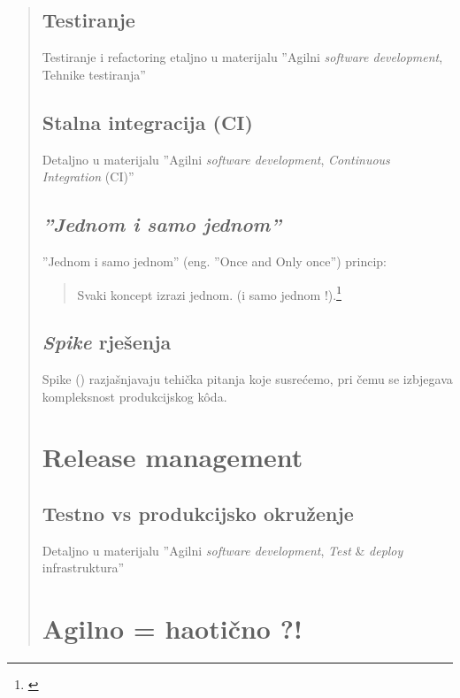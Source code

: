 \documentclass[lmodern, utf8, zavrsni]{fit}
\begin{document}
\begin{quote}
\section{Testiranje}

Testiranje i refactoring etaljno u materijalu ''Agilni \emph{software development}, Tehnike testiranja''\citep{agiletest}

\section{Stalna integracija (CI)}

Detaljno u materijalu ''Agilni \emph{software development}, \emph{Continuous Integration} (CI)''\citep{agileci}

\section{\emph{''Jednom i samo jednom''}}

''Jednom i samo jednom'' (eng. ''Once and Only once'') princip:

\begin{quotation}
  Svaki koncept izrazi jednom. (i samo jednom !).\footnote{\citep[str. 319]{agileart}}
\end{quotation}


\section{\emph{Spike} rješenja}

Spike (\href{http://translate.google.com/#en/hr/spike}{\color{blue}{bos. ekser, smeč}}) razjašnjavaju tehička pitanja koje susrećemo, pri čemu se izbjegava kompleksnost produkcijskog k\^oda.\citep[str. 334]{agileart}


\chapter{Release management}

\section{Testno vs produkcijsko okruženje}

Detaljno u materijalu ''Agilni \emph{software development}, \emph{Test} \& \emph{deploy} infrastruktura''\citep{agiletestdeploy}

\chapter{Agilno = haotično ?!}


\end{quote}
\end{document}
